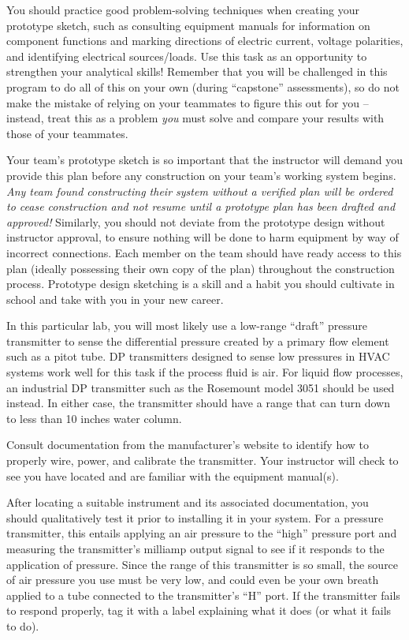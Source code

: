 You should practice good problem-solving techniques when creating your prototype sketch, such as consulting equipment manuals for information on component functions and marking directions of electric current, voltage polarities, and identifying electrical sources/loads.  Use this task as an opportunity to strengthen your analytical skills!  Remember that you will be challenged in this program to do all of this on your own (during ``capstone'' assessments), so do not make the mistake of relying on your teammates to figure this out for you -- instead, treat this as a problem {\it you} must solve and compare your results with those of your teammates.

Your team's prototype sketch is so important that the instructor will demand you provide this plan before any construction on your team's working system begins.  {\it Any team found constructing their system without a verified plan will be ordered to cease construction and not resume until a prototype plan has been drafted and approved!}  Similarly, you should not deviate from the prototype design without instructor approval, to ensure nothing will be done to harm equipment by way of incorrect connections.  Each member on the team should have ready access to this plan (ideally possessing their own copy of the plan) throughout the construction process.  Prototype design sketching is a skill and a habit you should cultivate in school and take with you in your new career.

\vskip 10pt

In this particular lab, you will most likely use a low-range ``draft'' pressure transmitter to sense the differential pressure created by a primary flow element such as a pitot tube.  DP transmitters designed to sense low pressures in HVAC systems work well for this task if the process fluid is air.  For liquid flow processes, an industrial DP transmitter such as the Rosemount model 3051 should be used instead.  In either case, the transmitter should have a range that can turn down to less than 10 inches water column.

Consult documentation from the manufacturer's website to identify how to properly wire, power, and calibrate the transmitter.  Your instructor will check to see you have located and are familiar with the equipment manual(s).


After locating a suitable instrument and its associated documentation, you should qualitatively test it prior to installing it in your system.  For a pressure transmitter, this entails applying an air pressure to the ``high'' pressure port and measuring the transmitter's milliamp output signal to see if it responds to the application of pressure.  Since the range of this transmitter is so small, the source of air pressure you use must be very low, and could even be your own breath applied to a tube connected to the transmitter's ``H'' port.  If the transmitter fails to respond properly, tag it with a label explaining what it does (or what it fails to do).

